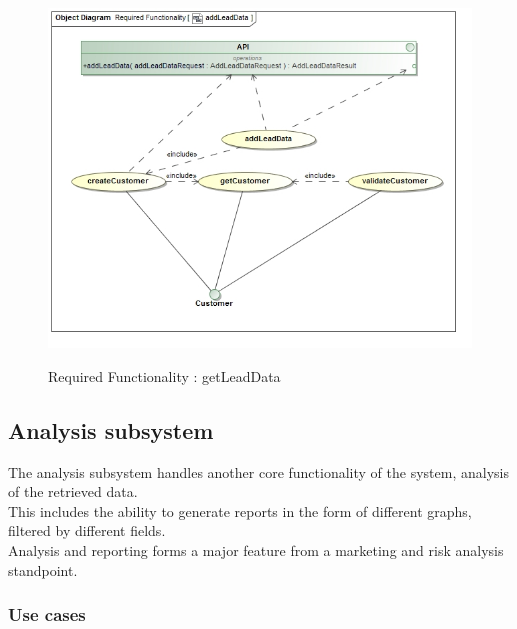 \documentclass{article}
\begin{document}
		\begin{figure}[H]
		\includegraphics[width=\textwidth]{images/obj__Required_Functionality__addLeadData.jpg}  \\
		\caption{Required Functionality : getLeadData}
		\end{figure}

		
	\pagebreak
	\subsection{Analysis subsystem}\label{subsec:Analysis}
	The analysis subsystem handles another core functionality of the system, analysis of the retrieved data.\\ This includes the ability to generate reports in the form of different graphs, filtered by different fields.\\ Analysis and reporting forms a major feature from a marketing and risk analysis standpoint.
		\subsubsection{Use cases}
\end{document}
